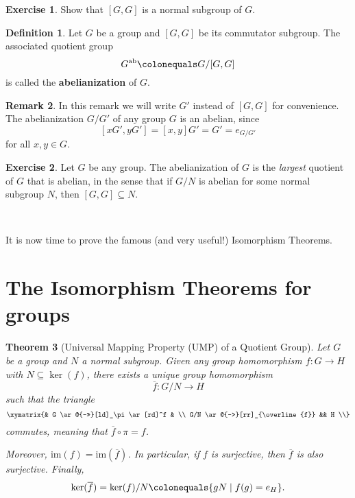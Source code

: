 \documentclass[12pt]{report}
\newtheorem{theorem}{Theorem}[chapter]
\numberwithin{equation}{section}
\numberwithin{theorem}{chapter}
\theoremstyle{definition}
\newtheorem{definition}[theorem]{Definition}
\newtheorem{exercise}{Exercise}
\newtheorem*{basic properties}{Basic Properties}
\newtheorem*{Important Remark}{Important Remark}
\newtheorem{remark}[theorem]{Remark}
\newcommand{\df}[1]{{\bf #1}\index{#1}}
\renewcommand{\ker}{\operatorname{ker}}
\begin{document}
\begin{exercise}
	Show that $[G,G]$ is a normal subgroup of $G$. 
\end{exercise}
  
  
\begin{definition}\label{abelianization of a group}
Let $G$ be a group and $[G,G]$ be its commutator subgroup. The associated quotient group 
$$G^{\textrm{ab}} \colonequals G/[G,G]$$ 
is called the \df{abelianization} of $G$.
\end{definition}  


\begin{remark}
In this remark we will write $G'$ instead of $[G,G]$ for convenience.
The abelianization $G/G'$ of any group $G$ is an abelian, since 
$$[xG', yG'] = [x,y]G' = G' = e_{G/G'}$$ 
for all $x,y \in G$.
\end{remark}

\begin{exercise}
	Let $G$ be any group. The abelianization of $G$ is the \emph{largest} quotient of $G$ that is abelian, in the sense that if $G/N$ is abelian for some normal subgroup $N$, then $[G,G] \subseteq N$.
\end{exercise}


\


It is now time to prove the famous (and very useful!) Isomorphism Theorems.


\section{The Isomorphism Theorems for groups}



\begin{theorem}[Universal Mapping Property (UMP) of a Quotient Group]\label{UMP quotient group}
Let $G$ be a group and $N$ a normal subgroup. Given any group homomorphism $f\!: G \to H$ with $N \subseteq \ker(f)$, there exists a unique group homomorphism 
$$\overline{f}: G/N \to H$$ 
such that the triangle
$$\xymatrix{& G \ar@{->>}[ld]_\pi \ar[rd]^f  & \\
G/N \ar@{-->}[rr]_{\overline{f}}  && H \\}$$
commutes, meaning that $\overline{f} \circ \pi = f$.

\vspace{0.5em}

Moreover, $\mathrm{im}(f) = \mathrm{im}(\overline{f})$. In particular, if $f$ is surjective, then $\overline{f}$ is also surjective. Finally,
$$\ker(\overline{f}) = \ker(f)/N \colonequals \{ g N \mid f(g) = e_H\}.$$
\end{theorem}
\end{document}
